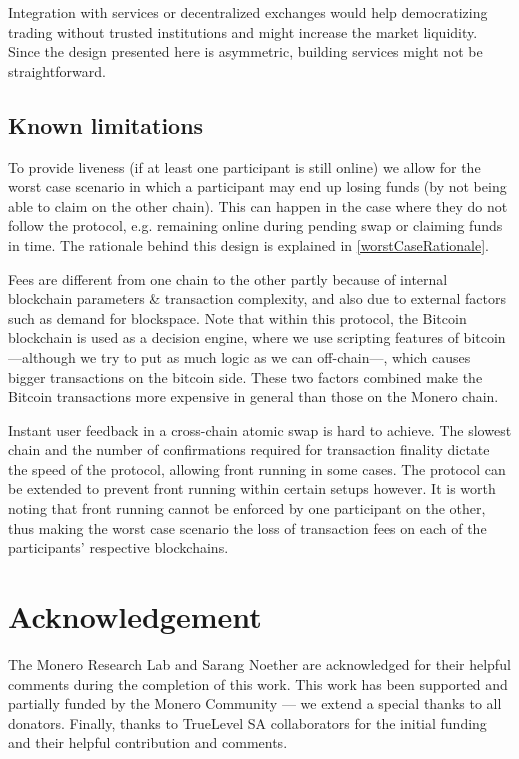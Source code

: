 \documentclass{llncs}
\begin{document}
Integration with services or decentralized exchanges would help democratizing trading without trusted institutions and might increase the market liquidity. Since the design presented here is asymmetric, building services might not be straightforward.

\subsection{Known limitations}
To provide liveness (if at least one participant is still online) we allow for the worst case scenario in which a participant may end up losing funds (by not being able to claim on the other chain). This can happen in the case where they do not follow the protocol, e.g. remaining online during pending swap or claiming funds in time. The rationale behind this design is explained in \ref{worstCaseRationale}.

Fees are different from one chain to the other partly because of internal blockchain parameters \& transaction complexity, and also due to external factors such as demand for blockspace. Note that within this protocol, the Bitcoin blockchain is used as a decision engine, where we use scripting features of bitcoin---although we try to put as much logic as we can off-chain---, which causes bigger transactions on the bitcoin side. These two factors combined make the Bitcoin transactions more expensive in general than those on the Monero chain.

Instant user feedback in a cross-chain atomic swap is hard to achieve.  The slowest chain and the number of confirmations required for transaction finality dictate the speed of the protocol, allowing front running in some cases. The protocol can be extended to prevent front running within certain setups however. It is worth noting that front running cannot be enforced by one participant on the other, thus making the worst case scenario the loss of transaction fees on each of the participants' respective blockchains.

\section{Acknowledgement}
The Monero Research Lab and Sarang Noether are acknowledged for their helpful comments during the completion of this work. This work has been supported and partially funded by the Monero Community --- we extend a special thanks to all donators. Finally, thanks to TrueLevel SA collaborators for the initial funding and their helpful contribution and comments.

%
%
\printbibliography
\end{document}
